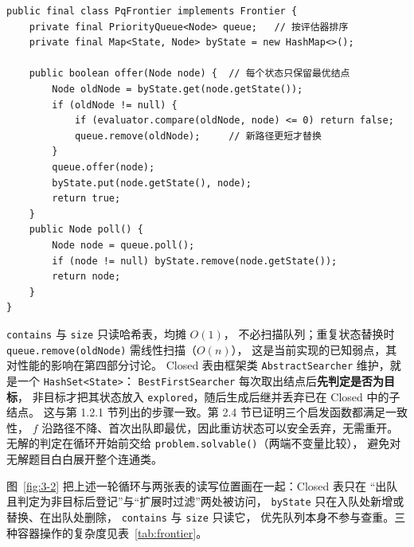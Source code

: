 \par\noindent\begin{minipage}{\linewidth}
\par\vspace{2bp}
{\fontsize{9.5bp}{12bp}\selectfont
\noindent\begin{minipage}{\linewidth}
\begin{verbatim}
public final class PqFrontier implements Frontier {
    private final PriorityQueue<Node> queue;   // 按评估器排序
    private final Map<State, Node> byState = new HashMap<>();

    public boolean offer(Node node) {  // 每个状态只保留最优结点
        Node oldNode = byState.get(node.getState());
        if (oldNode != null) {
            if (evaluator.compare(oldNode, node) <= 0) return false;
            queue.remove(oldNode);     // 新路径更短才替换
        }
        queue.offer(node);
        byState.put(node.getState(), node);
        return true;
    }
    public Node poll() {
        Node node = queue.poll();
        if (node != null) byState.remove(node.getState());
        return node;
    }
}
\end{verbatim}
\end{minipage}}
\end{minipage}\par

\texttt{contains} 与 \texttt{size} 只读哈希表，均摊 $O(1)$，
不必扫描队列；重复状态替换时 \texttt{queue.remove(oldNode)} 需线性扫描（$O(n)$），
这是当前实现的已知弱点，其对性能的影响在第四部分讨论。
Closed 表由框架类 \texttt{AbstractSearcher} 维护，就是一个 \texttt{HashSet<State>}：
\texttt{BestFirstSearcher} 每次取出结点后\textbf{先判定是否为目标}，
非目标才把其状态放入 \texttt{explored}，随后生成后继并丢弃已在 Closed 中的子结点。
这与第 1.2.1 节列出的步骤一致。第 2.4 节已证明三个启发函数都满足一致性，
$f$ 沿路径不降、首次出队即最优，因此重访状态可以安全丢弃，无需重开。
无解的判定在循环开始前交给 \texttt{problem.solvable()}（两端不变量比较），
避免对无解题目白白展开整个连通类。

图~\ref{fig:3-2} 把上述一轮循环与两张表的读写位置画在一起：Closed 表只在
“出队且判定为非目标后登记”与“扩展时过滤”两处被访问，
\texttt{byState} 只在入队处新增或替换、在出队处删除，
\texttt{contains} 与 \texttt{size} 只读它，
优先队列本身不参与查重。三种容器操作的复杂度见表~\ref{tab:frontier}。


